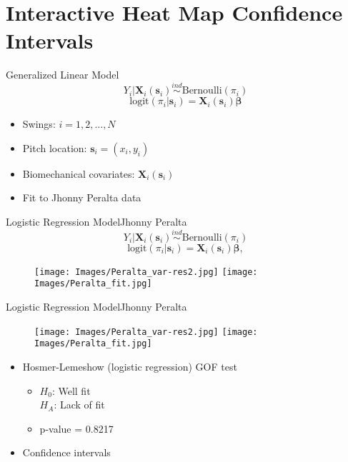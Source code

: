 \documentclass{beamer}
\begin{document}
\section{Interactive Heat Map Confidence Intervals}

\begin{frame}{Generalized Linear Model}{}
$$Y_{i}|\mathbf{X}_{i}(\mathbf{s}_{i}) \stackrel{ind}{\sim} \mbox{Bernoulli}(\pi_{i}) $$
$$ \text{logit}(\pi_{i}|\pmb{s}_{i}) = \mathbf{X}_{i}(\mathbf{s}_{i})\pmb{\beta} $$
\begin{itemize}
  \addtolength{\itemsep}{0.5\baselineskip}
\item Swings: $i = 1,2,\ldots, N$
\item Pitch location: $\mathbf{s}_{i} = (x_{i},y_{i})$
\item Biomechanical covariates: $\mathbf{X}_{i}(\mathbf{s}_{i})$
\item Fit to Jhonny Peralta data
\end{itemize}

\end{frame}

\begin{frame}{Logistic Regression Model}{Jhonny Peralta} %
$$Y_{i}|\mathbf{X}_{i}(\mathbf{s}_{i}) \stackrel{ind}{\sim} \mbox{Bernoulli}(\pi_{i}) $$
$$ \text{logit}(\pi_{i}|\pmb{s}_{i}) = \mathbf{X}_{i}(\mathbf{s}_{i})\pmb{\beta}, $$
  \begin{figure}[H]
	\centering
	\texttt{[image: Images/Peralta\_var-res2.jpg]}
	\texttt{[image: Images/Peralta\_fit.jpg]}
	\end{figure}
\end{frame}

\begin{frame}{Logistic Regression Model}{Jhonny Peralta} %
  \begin{figure}[H]
	\centering
	\texttt{[image: Images/Peralta\_var-res2.jpg]}
	\texttt{[image: Images/Peralta\_fit.jpg]}
	\end{figure}
\begin{itemize}
\addtolength{\itemsep}{0.5\baselineskip}
\item Hosmer-Lemeshow (logistic regression) GOF test
  \begin{itemize}
  \addtolength{\itemsep}{0.5\baselineskip}
  \item $H_0$: Well fit \\ $H_A$: Lack of fit
  \item p-value = 0.8217
  \end{itemize}
\item Confidence intervals
\end{itemize}
\end{frame}
\end{document}
